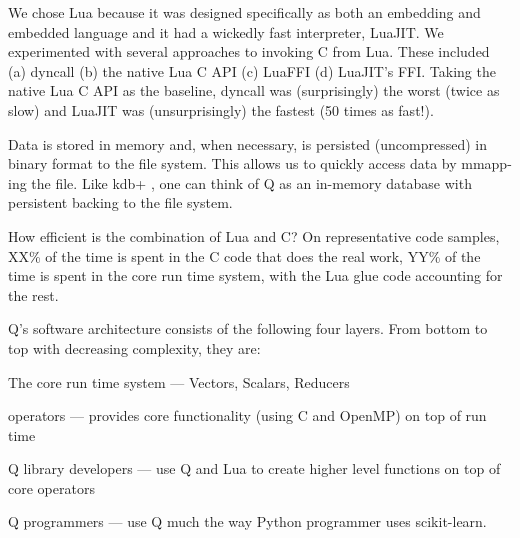 We chose Lua
because it was designed specifically as both an embedding and embedded language
\cite{Lua2011} and it had a wickedly fast interpreter, LuaJIT.
We experimented with several approaches to invoking C from Lua. These included
(a) dyncall \cite{Adler2013} (b) the native Lua C API (c) LuaFFI (d) LuaJIT's
FFI. Taking the native Lua C API as the baseline, dyncall was (surprisingly) the worst (twice
as slow) and LuaJIT was (unsurprisingly) the fastest (50 times as fast!).

Data is stored in memory and, when necessary, is persisted (uncompressed) in
binary format to the file system. This allows us to quickly access data by
mmapp-ing the file.  Like kdb+ \cite{Borror2015}, one can think of Q as 
an in-memory database with persistent backing to the file system.

How efficient is the combination of Lua and C? On representative code samples,
XX\% of the time is spent in the C code that does the real work, YY\% of the
time is spent in the core run time system, with the Lua glue code accounting for
the rest. 

Q's software architecture consists of the following four layers. From bottom to
top with decreasing complexity, they are:
\be
\item The core run time system --- Vectors, Scalars, Reducers
\item operators --- provides core functionality (using C and OpenMP) on
  top of run time
\item Q library developers --- use Q and Lua to create higher level functions on
  top of core operators
\item Q programmers --- use Q much the way  Python programmer uses scikit-learn.
  \ee







% 
